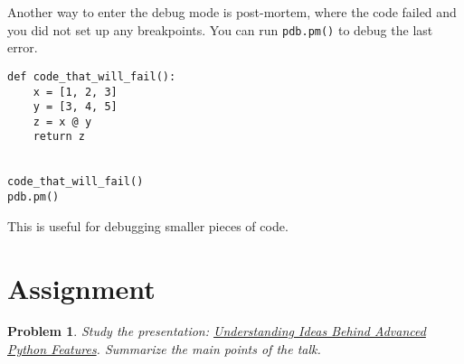 \documentclass[12pt, a4paper]{article}
\newtheorem{problem}{Problem}
\begin{document}
Another way to enter the debug mode is post-mortem, where the code failed and you did not set up any breakpoints.
You can run \texttt{pdb.pm()} to debug the last error.
\lstset{language=jupyter-python,label= ,caption= ,captionpos=b,numbers=none}
\begin{lstlisting}
def code_that_will_fail():
    x = [1, 2, 3]
    y = [3, 4, 5]
    z = x @ y
    return z


code_that_will_fail()
pdb.pm()
\end{lstlisting}
This is useful for debugging smaller pieces of code.
\section{Assignment}
\label{sec:org63b2db2}
\begin{problem}
Study the presentation: \href{https://youtu.be/cKPlPJyQrt4?t=123}{Understanding Ideas Behind Advanced Python Features}.
Summarize the main points of the talk.
\end{problem}
\end{document}
